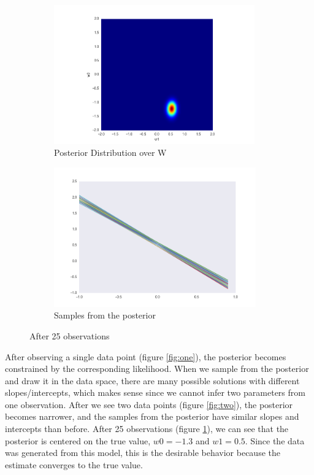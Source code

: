 \documentclass[a4paper,11pt]{article}
\theoremstyle{mytheor}
\begin{document}
\begin{figure}[h]
\begin{subfigure}{0.5\textwidth}
\includegraphics[width=\linewidth, height=6cm]{posterior-final} 
\caption{Posterior Distribution over W}
\end{subfigure}
\begin{subfigure}{0.5\textwidth}
\includegraphics[width=\linewidth, height=6cm]{samples-final}
\caption{Samples from the posterior}
\end{subfigure}
\caption{After 25 observations}
\label{fig:final}
\end{figure}

After observing a single data point (figure \ref{fig:one}), the posterior becomes constrained by the corresponding likelihood. When we sample from the posterior and draw it in the data space, there are many possible solutions with different slopes/intercepts, which makes sense since we cannot infer two parameters from one observation. After we see two data points (figure \ref{fig:two}), the posterior becomes narrower, and the samples from the posterior have similar slopes and intercepts than before. After 25 observations (figure \ref{fig:final}), we can see that the posterior is centered on the true value, $w0 = -1.3$ and $w1 = 0.5$.
Since the data was generated from this model, this is the desirable behavior because the estimate converges to the true value.
\end{document}
